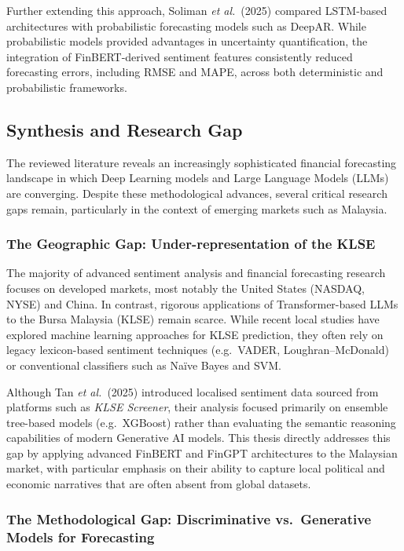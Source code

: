\documentclass[singlespace]{ucetd}
\begin{document}
Further extending this approach, Soliman \textit{et al.}\ (2025) compared LSTM-based architectures with probabilistic forecasting models such as DeepAR. While probabilistic models provided advantages in uncertainty quantification, the integration of FinBERT-derived sentiment features consistently reduced forecasting errors, including RMSE and MAPE, across both deterministic and probabilistic frameworks.



\subsection{Synthesis and Research Gap}

The reviewed literature reveals an increasingly sophisticated financial forecasting landscape in which Deep Learning models and Large Language Models (LLMs) are converging. Despite these methodological advances, several critical research gaps remain, particularly in the context of emerging markets such as Malaysia.

\subsubsection{The Geographic Gap: Under-representation of the KLSE}

The majority of advanced sentiment analysis and financial forecasting research focuses on developed markets, most notably the United States (NASDAQ, NYSE) and China. In contrast, rigorous applications of Transformer-based LLMs to the Bursa Malaysia (KLSE) remain scarce. While recent local studies have explored machine learning approaches for KLSE prediction, they often rely on legacy lexicon-based sentiment techniques (e.g.\ VADER, Loughran--McDonald) or conventional classifiers such as Na\"ive Bayes and SVM. 

Although Tan \textit{et al.}\ (2025) introduced localised sentiment data sourced from platforms such as \emph{KLSE Screener}, their analysis focused primarily on ensemble tree-based models (e.g.\ XGBoost) rather than evaluating the semantic reasoning capabilities of modern Generative AI models. This thesis directly addresses this gap by applying advanced FinBERT and FinGPT architectures to the Malaysian market, with particular emphasis on their ability to capture local political and economic narratives that are often absent from global datasets.

\subsubsection{The Methodological Gap: Discriminative vs.\ Generative Models for Forecasting}
\end{document}
